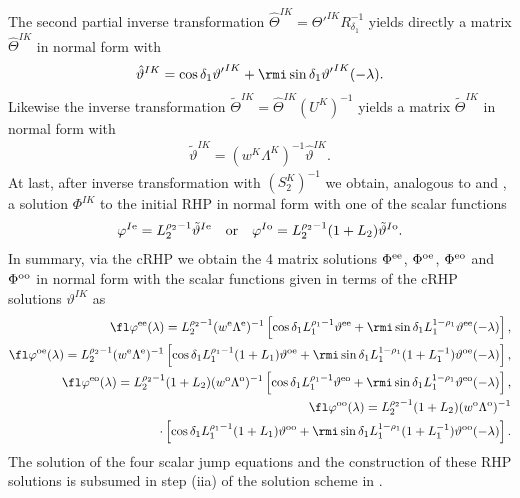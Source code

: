 \documentclass[12pt]{iopart}
\begin{document}
The second partial inverse transformation $\hat{\Theta}^{IK}={\Theta'}^{IK}R^{-1}_{\delta_1}$ yields directly a matrix $\hat{\Theta}^{IK}$ in normal form with
\begin{eqnarray}
\hat{\vartheta}^{IK}=\cos \delta_1 {\vartheta'}^{IK} +\rmi \sin \delta_1 {\vartheta'}^{IK}(-\lambda).
\end{eqnarray}
Likewise the inverse transformation $\tilde{\Theta}^{IK}=\hat{\Theta}^{IK}(U^K)^{-1}$ yields a matrix ${\tilde{\Theta}}^{IK}$ in normal form with
\begin{eqnarray}
\tilde{\vartheta}^{IK}=(w^K\Lambda^K)^{-1}\hat{\vartheta}^{IK}.
\end{eqnarray}
At last, after inverse transformation with $(S_2^{K})^{-1}$ we obtain, analogous to  and , a solution $\Phi^{IK}$ to the initial RHP in normal form with one of the scalar functions
\begin{eqnarray}
\varphi^{I \rm{e}}=L_2^{\rho_2-1}\tilde{\vartheta}^{I\rm{e}} \quad \mbox{or}\quad
\varphi^{I \rm{o}}=L_2^{\rho_2-1}(1+L_2)\tilde{\vartheta}^{I\rm{o}}.
\end{eqnarray}
In summary, via the cRHP we obtain the 4 matrix solutions $\Phi^{\rm ee}$, $\Phi^{\rm oe}$, $\Phi^{\rm eo}$ and $\Phi^{\rm oo}$ in normal form with the scalar functions given in terms of the cRHP solutions $\vartheta^{IK}$ as
\begin{eqnarray}
\fl\varphi^{\rm ee}(\lambda)=L_2^{\rho_2-1}(w^{\rm e}\Lambda^{\rm e})^{-1}\left[\cos\delta_1 L_1^{\rho_1-1}\vartheta^{\rm ee}+\rmi\sin\delta_1 L_1^{1-\rho_1}\vartheta^{\rm ee}(-\lambda)\right],
\nonumber\\ \fl
\varphi^{\rm oe}(\lambda)=L_2^{\rho_2-1}(w^{\rm e}\Lambda^{\rm e})^{-1}\left[\cos\delta_1 L_1^{\rho_1-1}(1+L_1)\vartheta^{\rm oe}+\rmi\sin\delta_1 L_1^{1-\rho_1}(1+L_1^{-1})\vartheta^{\rm oe}(-\lambda)\right], \nonumber\\ \fl
\varphi^{\rm eo}(\lambda)=L_2^{\rho_2-1}(1+L_2)(w^{\rm o}\Lambda^{\rm o})^{-1}\left[\cos\delta_1 L_1^{\rho_1-1}\vartheta^{\rm eo}+\rmi\sin\delta_1 L_1^{1-\rho_1}\vartheta^{\rm eo}(-\lambda)\right], \label{Chieeoo}\\ 
\fl\varphi^{\rm oo}(\lambda)=L_2^{\rho_2-1}(1+L_2)(w^{\rm o}\Lambda^{\rm o})^{-1} \nonumber\\ \cdot\left[\cos\delta_1 L_1^{\rho_1-1}(1+L_1)\vartheta^{\rm oo}+\rmi\sin\delta_1 L_1^{1-\rho_1}(1+L_1^{-1})\vartheta^{\rm oo}(-\lambda)\right]. \nonumber
\end{eqnarray}
The solution of the four scalar jump equations  and the construction of these RHP solutions is subsumed in step (iia) of the solution scheme in .
\end{document}
